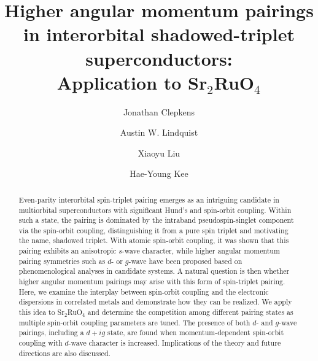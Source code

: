 \documentclass[%
reprint,
superscriptaddress,
 amsmath,amssymb,
 aps,
prb,
nobalancelastpage,
]{revtex4-2}
\newcommand{\Sr}{\texorpdfstring{Sr$_{2}$RuO$_{4}$}{Sr2RuO4}}
\begin{document}





\title{\texorpdfstring{Higher angular momentum pairings in interorbital shadowed-triplet superconductors:\\ Application to \protect\Sr}{Higher angular momentum pairings in interorbital shadowed-triplet superconductors:Application to \protect\Sr}}





\author{Jonathan Clepkens}
\author{Austin W. Lindquist}
\author{Xiaoyu Liu}
\author{Hae-Young Kee}





\begin{abstract}
Even-parity interorbital spin-triplet pairing emerges as an intriguing candidate in multiorbital superconductors with significant Hund's and spin-orbit coupling. Within such a state, the pairing is dominated by the intraband pseudospin-singlet component via the spin-orbit coupling, distinguishing it from a pure spin triplet and motivating the name, shadowed triplet. With atomic spin-orbit coupling, it was shown that this pairing exhibits an anisotropic $s$-wave character, while higher angular momentum pairing symmetries such as $d$- or $g$-wave have been proposed based on phenomenological analyses in candidate systems. A natural question is then whether higher angular momentum pairings may arise with this form of spin-triplet pairing. Here, we examine the interplay between spin-orbit coupling and the electronic dispersions in correlated metals and demonstrate how they can be realized. We apply this idea to Sr$_{2}$RuO$_{4}$ and determine the competition among different pairing states as multiple spin-orbit coupling parameters are tuned. The presence of both $d$- and $g$-wave pairings, including a $d+ig$ state, are found when momentum-dependent spin-orbit coupling with $d$-wave character is increased. Implications of the theory and future directions are also discussed.
\end{abstract}
\end{document}
